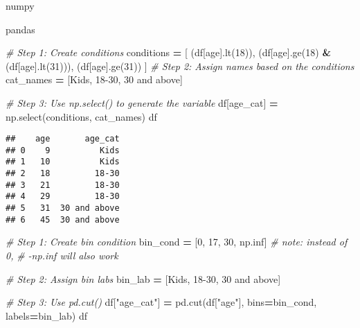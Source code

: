 \documentclass[
]{book}
\newenvironment{Shaded}{\begin{snugshade}}{\end{snugshade}}
\newcommand{\CommentTok}[1]{\textcolor[rgb]{0.56,0.35,0.01}{\textit{#1}}}
\newcommand{\DecValTok}[1]{\textcolor[rgb]{0.00,0.00,0.81}{#1}}
\newcommand{\NormalTok}[1]{#1}
\newcommand{\OperatorTok}[1]{\textcolor[rgb]{0.81,0.36,0.00}{\textbf{#1}}}
\newcommand{\StringTok}[1]{\textcolor[rgb]{0.31,0.60,0.02}{#1}}
\begin{document}
numpy

pandas

\begin{Shaded}
\begin{Highlighting}[]
\CommentTok{\# Step 1: Create conditions}
\NormalTok{conditions }\OperatorTok{=}\NormalTok{ [}
\NormalTok{  (df[}\StringTok{\textquotesingle{}age\textquotesingle{}}\NormalTok{].lt(}\DecValTok{18}\NormalTok{)),}
\NormalTok{  (df[}\StringTok{\textquotesingle{}age\textquotesingle{}}\NormalTok{].ge(}\DecValTok{18}\NormalTok{) }\OperatorTok{\&}\NormalTok{ (df[}\StringTok{\textquotesingle{}age\textquotesingle{}}\NormalTok{].lt(}\DecValTok{31}\NormalTok{))),}
\NormalTok{  (df[}\StringTok{\textquotesingle{}age\textquotesingle{}}\NormalTok{].ge(}\DecValTok{31}\NormalTok{))}
\NormalTok{]}
\CommentTok{\# Step 2: Assign names based on the conditions}
\NormalTok{cat\_names }\OperatorTok{=}\NormalTok{ [}\StringTok{\textquotesingle{}Kids\textquotesingle{}}\NormalTok{, }\StringTok{\textquotesingle{}18{-}30\textquotesingle{}}\NormalTok{, }\StringTok{\textquotesingle{}30 and above\textquotesingle{}}\NormalTok{]}

\CommentTok{\# Step 3: Use np.select() to generate the variable}
\NormalTok{df[}\StringTok{\textquotesingle{}age\_cat\textquotesingle{}}\NormalTok{] }\OperatorTok{=}\NormalTok{ np.select(conditions, cat\_names)}
\NormalTok{df}
\end{Highlighting}
\end{Shaded}

\begin{verbatim}
##    age       age_cat
## 0    9          Kids
## 1   10          Kids
## 2   18         18-30
## 3   21         18-30
## 4   29         18-30
## 5   31  30 and above
## 6   45  30 and above
\end{verbatim}

\begin{Shaded}
\begin{Highlighting}[]
\CommentTok{\# Step 1: Create bin condition}
\NormalTok{bin\_cond }\OperatorTok{=}\NormalTok{ [}\DecValTok{0}\NormalTok{, }\DecValTok{17}\NormalTok{, }\DecValTok{30}\NormalTok{, np.inf] }
\CommentTok{\# note: instead of 0, }
\CommentTok{\#    {-}np.inf will also work}

\CommentTok{\# Step 2: Assign bin labs}
\NormalTok{bin\_lab }\OperatorTok{=}\NormalTok{ [}\StringTok{\textquotesingle{}Kids\textquotesingle{}}\NormalTok{, }\StringTok{\textquotesingle{}18{-}30\textquotesingle{}}\NormalTok{,}
           \StringTok{\textquotesingle{}30 and above\textquotesingle{}}\NormalTok{]}

\CommentTok{\# Step 3: Use pd.cut() }
\NormalTok{df[}\StringTok{"age\_cat"}\NormalTok{] }\OperatorTok{=}\NormalTok{ pd.cut(df[}\StringTok{"age"}\NormalTok{],}
\NormalTok{                       bins}\OperatorTok{=}\NormalTok{bin\_cond,}
\NormalTok{                       labels}\OperatorTok{=}\NormalTok{bin\_lab)}
\NormalTok{df}
\end{Highlighting}
\end{Shaded}
\end{document}

